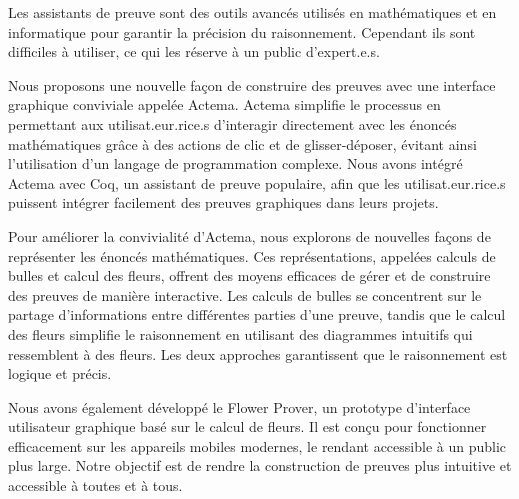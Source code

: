 Les assistants de preuve sont des outils avancés utilisés en mathématiques et en informatique pour garantir la précision du raisonnement. Cependant ils sont difficiles à utiliser, ce qui les réserve à un public d'expert.e.s.

Nous proposons une nouvelle façon de construire des preuves avec une interface graphique conviviale appelée Actema. Actema simplifie le processus en permettant aux utilisat.eur.rice.s d'interagir directement avec les énoncés mathématiques grâce à des actions de clic et de glisser-déposer, évitant ainsi l'utilisation d'un langage de programmation complexe. Nous avons intégré Actema avec Coq, un assistant de preuve populaire, afin que les utilisat.eur.rice.s puissent intégrer facilement des preuves graphiques dans leurs projets.

Pour améliorer la convivialité d'Actema, nous explorons de nouvelles façons de représenter les énoncés mathématiques. Ces représentations, appelées calculs de bulles et calcul des fleurs, offrent des moyens efficaces de gérer et de construire des preuves de manière interactive. Les calculs de bulles se concentrent sur le partage d'informations entre différentes parties d'une preuve, tandis que le calcul des fleurs simplifie le raisonnement en utilisant des diagrammes intuitifs qui ressemblent à des fleurs. Les deux approches garantissent que le raisonnement est logique et précis.

Nous avons également développé le Flower Prover, un prototype d'interface utilisateur graphique basé sur le calcul de fleurs. Il est conçu pour fonctionner efficacement sur les appareils mobiles modernes, le rendant accessible à un public plus large. Notre objectif est de rendre la construction de preuves plus intuitive et accessible à toutes et à tous.
